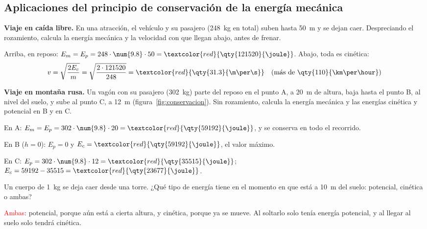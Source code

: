 \subsection{Aplicaciones del principio de conservación de la energía mecánica}

\begin{example}
    \textbf{Viaje en caída libre.} En una atracción, el vehículo y su pasajero (\qty{248}{\kg} en total) suben hasta \qty{50}{\m} y se dejan caer. Despreciando el rozamiento, calcula la energía mecánica y la velocidad con que llegan abajo, antes de frenar.

    Arriba, en reposo: \(E_m = E_p = 248 \cdot \num{9.8} \cdot 50 = \textcolor{red}{\qty{121520}{\joule}}\). Abajo, toda es cinética:
    \[ v = \sqrt{\frac{2 E_c}{m}} = \sqrt{\frac{2 \cdot 121520}{248}} = \textcolor{red}{\qty{31.3}{\m\per\s}} \quad (\text{más de } \qty{110}{\km\per\hour}) \]
\end{example}

\begin{example}
    \textbf{Viaje en montaña rusa.} Un vagón con su pasajero (\qty{302}{\kg}) parte del reposo en el punto A, a \qty{20}{\m} de altura, baja hasta el punto B, al nivel del suelo, y sube al punto C, a \qty{12}{\m} (figura~\ref{fig:conservacion}). Sin rozamiento, calcula la energía mecánica y las energías cinética y potencial en B y en C.

    En A: \(E_m = E_p = 302 \cdot \num{9.8} \cdot 20 = \textcolor{red}{\qty{59192}{\joule}}\), y se conserva en todo el recorrido.

    En B (\(h = 0\)): \(E_p = 0\) y \(E_c = \textcolor{red}{\qty{59192}{\joule}}\), el valor máximo.

    En C: \(E_p = 302 \cdot \num{9.8} \cdot 12 = \textcolor{red}{\qty{35515}{\joule}}\); \(E_c = 59192 - 35515 = \textcolor{red}{\qty{23677}{\joule}}\).
\end{example}

\begin{exercise}
    Un cuerpo de \qty{1}{\kg} se deja caer desde una torre. ¿Qué tipo de energía tiene en el momento en que está a \qty{10}{\m} del suelo: potencial, cinética o ambas?
    \begin{solu}
        \textcolor{red}{Ambas}: potencial, porque aún está a cierta altura, y cinética, porque ya se mueve. Al soltarlo solo tenía energía potencial, y al llegar al suelo solo tendrá cinética.
    \end{solu}
\end{exercise}

